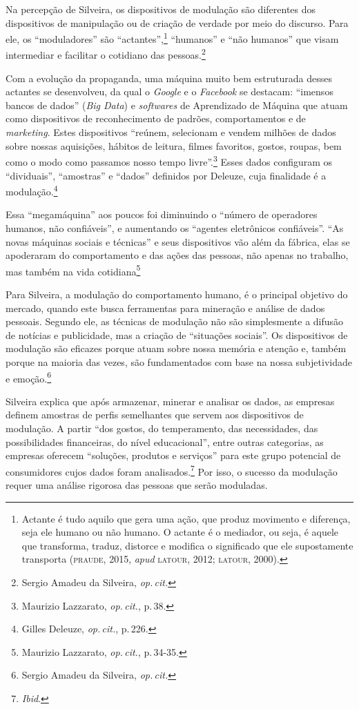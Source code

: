 Na percepção de Silveira, os dispositivos de modulação são
diferentes dos dispositivos de manipulação ou de criação de verdade por
meio do discurso. Para ele, os ``moduladores'' são
``actantes'',\footnote{Actante é tudo aquilo que gera uma ação, que
  produz movimento e diferença, seja ele humano ou não humano. O actante
  é o mediador, ou seja, é aquele que transforma, traduz, distorce e
  modifica o significado que ele supostamente transporta (\textsc{praude}, 2015,
  \emph{apud} \textsc{latour}, 2012; \textsc{latour}, 2000).} ``humanos'' e ``não humanos'' que visam intermediar e facilitar o cotidiano das pessoas.\footnote{Sergio Amadeu da Silveira, \textit{op.\,cit.}}

Com a evolução da propaganda, uma máquina muito bem estruturada desses
actantes se desenvolveu, da qual o \emph{Google} e o \emph{Facebook} se
destacam: ``imensos bancos de dados'' (\emph{Big Data}) e \emph{softwares} de
Aprendizado de Máquina que atuam como dispositivos de reconhecimento de
padrões, comportamentos e de \emph{marketing}. Estes dispositivos ``reúnem,
selecionam e vendem milhões de dados sobre nossas aquisições, hábitos de
leitura, filmes favoritos, gostos, roupas, bem como o modo como passamos
nosso tempo livre''.\footnote{Maurizio Lazzarato, \textit{op.\,cit.}, p.\,38.} Esses dados configuram os ``dividuais'', ``amostras'' e ``dados'' definidos por Deleuze, cuja
finalidade é a modulação.\footnote{Gilles Deleuze, \textit{op.\,cit.}, p.\,226.}

Essa ``megamáquina'' aos poucos foi diminuindo o ``número de operadores
humanos, não confiáveis'', e aumentando os ``agentes eletrônicos
confiáveis''. ``As novas máquinas sociais e técnicas'' e seus
dispositivos vão além da fábrica, elas se apoderaram do comportamento e
das ações das pessoas, não apenas no trabalho, mas também na vida
cotidiana\footnote{Maurizio Lazzarato, \textit{op.\,cit.}, p.\,34-35.}

Para Silveira, a modulação do comportamento humano, é o principal
objetivo do mercado, quando este busca ferramentas para mineração e
análise de dados pessoais. Segundo ele, as técnicas de modulação não são
simplesmente a difusão de notícias e publicidade, mas a criação de
``situações sociais''. Os dispositivos de modulação são eficazes porque
atuam sobre nossa memória e atenção e, também porque na maioria das
vezes, são fundamentados com base na nossa subjetividade e emoção.\footnote{Sergio Amadeu da Silveira, \textit{op.\,cit.}}

Silveira explica que após armazenar, minerar e analisar os dados,
as empresas definem amostras de perfis semelhantes que servem aos
dispositivos de modulação. A partir ``dos gostos, do temperamento, das
necessidades, das possibilidades financeiras, do nível educacional'',
entre outras categorias, as empresas oferecem ``soluções, produtos e
serviços'' para este grupo potencial de consumidores cujos dados foram
analisados.\footnote{\textit{Ibid}.} Por isso, o sucesso da modulação requer uma
análise rigorosa das pessoas que serão moduladas.

